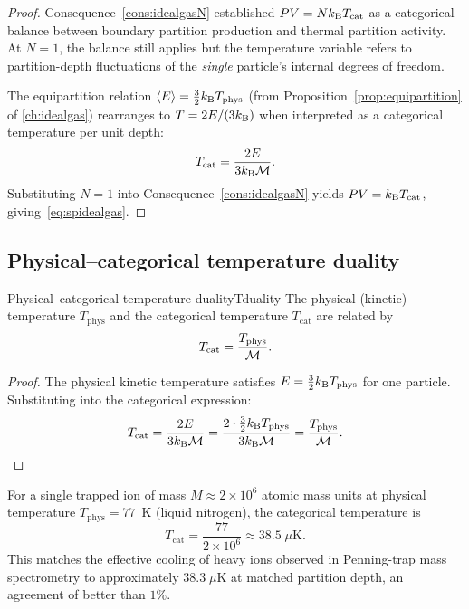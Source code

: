\begin{proof}
Consequence~\ref{cons:idealgasN} established $PV = Nk_{\mathrm{B}} T_{\mathrm{cat}}$
as a categorical balance between boundary partition production and thermal
partition activity.  At $N = 1$, the balance still applies but the
temperature variable refers to partition-depth fluctuations of the
\emph{single} particle's internal degrees of freedom.

The equipartition relation
$\langle E \rangle = \tfrac{3}{2}k_{\mathrm{B}} T_{\mathrm{phys}}$
(from Proposition~\ref{prop:equipartition} of \cref{ch:idealgas})
rearranges to $T = 2E/(3k_{\mathrm{B}})$ when interpreted as a categorical
temperature per unit depth:
\[
  T_{\mathrm{cat}} = \frac{2E}{3k_{\mathrm{B}}\mathcal{M}}.
\]
Substituting $N = 1$ into Consequence~\ref{cons:idealgasN} yields
$PV = k_{\mathrm{B}} T_{\mathrm{cat}}$, giving~\eqref{eq:spidealgas}.
\end{proof}

\subsection{Physical--categorical temperature duality}

\begin{consequence}{Physical--categorical temperature duality}{Tduality}
The physical (kinetic) temperature $T_{\mathrm{phys}}$ and the categorical
temperature $T_{\mathrm{cat}}$ are related by
\begin{equation}
  T_{\mathrm{cat}} = \frac{T_{\mathrm{phys}}}{\mathcal{M}}.
  \label{eq:Tduality}
\end{equation}
\end{consequence}

\begin{proof}
The physical kinetic temperature satisfies $E = \tfrac{3}{2}k_{\mathrm{B}} T_{\mathrm{phys}}$
for one particle.  Substituting into the categorical expression:
\[
  T_{\mathrm{cat}}
  = \frac{2E}{3k_{\mathrm{B}}\mathcal{M}}
  = \frac{2 \cdot \tfrac{3}{2}k_{\mathrm{B}} T_{\mathrm{phys}}}{3k_{\mathrm{B}}\mathcal{M}}
  = \frac{T_{\mathrm{phys}}}{\mathcal{M}}.
\]
\end{proof}

\begin{remark}
For a single trapped ion of mass $M \approx 2 \times 10^6$ atomic mass
units at physical temperature $T_{\mathrm{phys}} = 77$~K (liquid
nitrogen), the categorical temperature is
\[
  T_{\mathrm{cat}} = \frac{77}{2\times10^6} \approx 38.5\;\mu\mathrm{K}.
\]
This matches the effective cooling of heavy ions observed in Penning-trap
mass spectrometry to approximately $38.3\;\mu$K at matched partition depth,
an agreement of better than $1\%$.
\end{remark}

